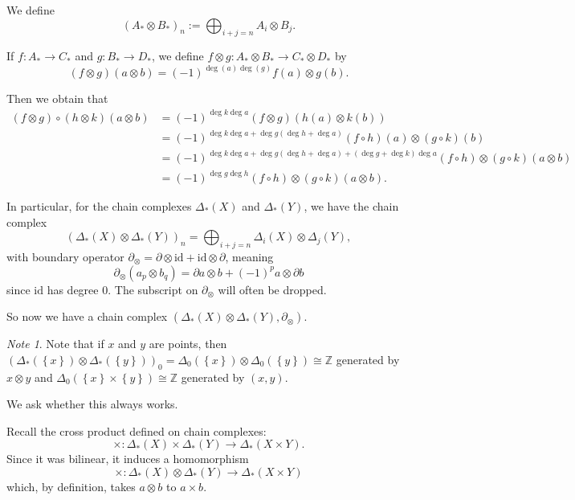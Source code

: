 \documentclass[reqno]{amsart}
\theoremstyle{definition}
\theoremstyle{remark}
\newtheorem*{note}{Note}
\newcommand{\id}{{\mathrm{id}}}
\begin{document}
We define
\[
    (A_* \otimes B_*)_n :=
    \bigoplus_{i+j=n} A_i \otimes B_j.
\] 

If $f \colon A_* \to C_*$ and $g \colon B_* \to D_*$, we
define
$f \otimes g \colon A_* \otimes B_* \to 
C_* \otimes D_*$ by
\[
    \left( f \otimes g \right) \left( a \otimes
    b\right) = (-1)^{\deg (a) \deg (g)} 
    f(a) \otimes g(b).
\] 

Then we obtain that
\begin{align*}
    \left( f \otimes g \right) \circ
    (h \otimes k) (a \otimes b) 
    &= (-1)^{\deg k \deg a} (f \otimes g) (h(a) \otimes k(b))\\
    &= (-1)^{\deg k \deg a + \deg g (\deg h + \deg a)}
    (f \circ h)(a) \otimes (g \circ k)(b)\\
    &= (-1)^{\deg k \deg a + \deg g(\deg h + \deg a) +
    (\deg g + \deg k) \deg a}
    (f \circ h) \otimes (g \circ k) (a \otimes b)\\
    &=  (-1)^{\deg g \deg h} (f \circ h ) \otimes 
    (g \circ k) (a \otimes b).
\end{align*}


In particular, for the chain complexes
$\Delta_*(X)$ and $\Delta_*(Y)$, we have the chain complex
\[
    \left( \Delta_*(X) \otimes \Delta_*(Y) \right)_n
    = \bigoplus_{i+j=n} \Delta_i (X) \otimes \Delta_j(Y),
\] 
with boundary operator $\partial_{\otimes} = 
\partial \otimes \id + \id \otimes \partial$, meaning
\[
\partial_{\otimes}\left( a_p \otimes b_q \right) 
= \partial a \otimes b + (-1)^{p} a \otimes \partial b
\] 
since $\id$ has degree $0$.
The subscript on $\partial_{\otimes}$ will often be dropped.

So now we have a chain complex
$\left( \Delta_*(X) \otimes \Delta_*(Y) ,
\partial_{\otimes } \right) $.

\begin{note}
    Note that
    if $x$ and $y$ are points, then
     $\left( \Delta_* (\left\{ x \right\} ) 
     \otimes \Delta_*\left( \left\{ y \right\}  \right) \right)_0
     = \Delta_0 \left( \left\{ x \right\}  \right) 
     \otimes \Delta_0 \left( \left\{ y \right\}  \right) 
     \cong \mathbb{Z}$ generated by
     $x \otimes y$ and
     $\Delta_0 \left( \left\{ x \right\} \times 
     \left\{ y \right\} \right) \cong \mathbb{Z}$ generated
     by $(x,y)$.
\end{note}

We ask whether this always works.

Recall the cross product defined on
chain complexes:
\[
\times \colon \Delta_*(X) \times \Delta_*(Y) \to 
\Delta_*(X \times Y).
\] 
Since it was bilinear, it induces a homomorphism
\[
\times \colon \Delta_*(X) \otimes \Delta_*(Y) \to 
\Delta_*(X \times Y)
\] 
which, by definition, takes
$a \otimes b$ to $a \times b$.
\end{document}
